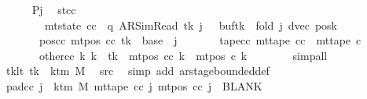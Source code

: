 \begin{isabellebody}
\ \ \ \ \isamarkupfalse%
\ Pj\ \isamarkupfalse%
\ st{\isacharunderscore}{\kern0pt}cc{\isacharcolon}{\kern0pt}\isanewline
\ \ \ \ \ \ \ \ {\isachardoublequoteopen}mt{\isacharunderscore}{\kern0pt}state\ cc\ {\isacharequal}{\kern0pt}\ {\isacharparenleft}{\kern0pt}q{\isacharcomma}{\kern0pt}\ AR{\isacharunderscore}{\kern0pt}SimRead{\isacharcomma}{\kern0pt}\ tk{\isacharcomma}{\kern0pt}\ j\ {\isacharplus}{\kern0pt}\ {}{\isacharcomma}{\kern0pt}\ buf{}{\isacharparenleft}{\kern0pt}tk\ {\isacharcolon}{\kern0pt}{\isacharequal}{\kern0pt}\ {\isacharquery}{\kern0pt}fold\ j{\isacharparenright}{\kern0pt}{\isacharcomma}{\kern0pt}\ dvec{\isacharcomma}{\kern0pt}\ posk{\isacharparenright}{\kern0pt}{\isachardoublequoteclose}\isanewline
\ \ \ \ \ \ \ pos{\isacharunderscore}{\kern0pt}cc{\isacharcolon}{\kern0pt}\ {\isachardoublequoteopen}mt{\isacharunderscore}{\kern0pt}pos\ cc\ tk\ {\isacharequal}{\kern0pt}\ base\ {\isacharplus}{\kern0pt}\ j{\isachardoublequoteclose}\isanewline
\ \ \ \ \ \ \ tape{\isacharunderscore}{\kern0pt}cc{\isacharcolon}{\kern0pt}\ {\isachardoublequoteopen}mt{\isacharunderscore}{\kern0pt}tape\ cc\ {\isacharequal}{\kern0pt}\ mt{\isacharunderscore}{\kern0pt}tape\ c{\isacharprime}{\kern0pt}{\isachardoublequoteclose}\isanewline
\ \ \ \ \ \ \ other{\isacharunderscore}{\kern0pt}cc{\isacharcolon}{\kern0pt}\ {\isachardoublequoteopen}{\isasymforall}k{\isacharprime}{\kern0pt}{\isachardot}{\kern0pt}\ k{\isacharprime}{\kern0pt}\ {\isasymnoteq}\ tk\ {\isasymlongrightarrow}\ mt{\isacharunderscore}{\kern0pt}pos\ cc\ k{\isacharprime}{\kern0pt}\ {\isacharequal}{\kern0pt}\ mt{\isacharunderscore}{\kern0pt}pos\ c{\isacharprime}{\kern0pt}\ k{\isacharprime}{\kern0pt}{\isachardoublequoteclose}\isanewline
\ \ \ \ \ \ \isamarkupfalse%
\ simp{\isacharunderscore}{\kern0pt}all\isanewline
\ \ \ \ \isamarkupfalse%
\ tk{\isacharunderscore}{\kern0pt}lt{\isacharcolon}{\kern0pt}\ {\isachardoublequoteopen}tk\ {\isacharless}{\kern0pt}\ k{\isacharunderscore}{\kern0pt}tm\ M{\isachardoublequoteclose}\ \isamarkupfalse%
\ src{}\ \isamarkupfalse%
\ {\isacharparenleft}{\kern0pt}simp\ add{\isacharcolon}{\kern0pt}\ ar{\isacharunderscore}{\kern0pt}stage{\isacharunderscore}{\kern0pt}bounded{\isacharunderscore}{\kern0pt}def{\isacharparenright}{\kern0pt}\isanewline
\ \ \ \ \isamarkupfalse%
\ pad{\isacharunderscore}{\kern0pt}cc{\isacharcolon}{\kern0pt}\ {\isachardoublequoteopen}{\isasymforall}j\ {\isasymge}\ k{\isacharunderscore}{\kern0pt}tm\ M{\isachardot}{\kern0pt}\ mt{\isacharunderscore}{\kern0pt}tape\ cc\ j\ {\isacharparenleft}{\kern0pt}mt{\isacharunderscore}{\kern0pt}pos\ cc\ j{\isacharparenright}{\kern0pt}\ {\isacharequal}{\kern0pt}\ BLANK{}{\isachardoublequoteclose}\isanewline

\end{isabellebody}
